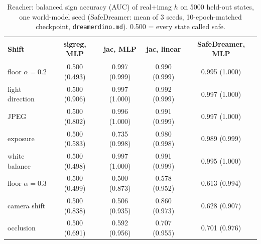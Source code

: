 \documentclass{article}
\begin{document}
\begin{table}[t]\centering\small
\caption{Reacher: balanced sign accuracy (AUC) of real+imag $h$ on 5000 held-out states, one world-model seed (SafeDreamer: mean of 3 seeds, 10-epoch-matched checkpoint, \texttt{dreamerdino.md}). 0.500 = every state called safe.}
\label{tab:reacher_signacc}
\begin{tabular}{lcccc}
\toprule
Shift & sigreg, MLP & jac, MLP & jac, linear & SafeDreamer, MLP \\
\midrule
floor $\alpha=0.2$ & 0.500 (0.493) & 0.997 (0.999) & 0.990 (0.999) & 0.995 (1.000) \\
light direction & 0.500 (0.906) & 0.997 (1.000) & 0.992 (0.999) & 0.997 (1.000) \\
JPEG & 0.500 (0.802) & 0.996 (1.000) & 0.991 (0.999) & 0.997 (1.000) \\
exposure & 0.500 (0.583) & 0.735 (0.998) & 0.980 (0.998) & 0.989 (0.999) \\
white balance & 0.500 (0.498) & 0.997 (1.000) & 0.991 (0.999) & 0.995 (1.000) \\
floor $\alpha=0.3$ & 0.500 (0.499) & 0.500 (0.873) & 0.578 (0.952) & 0.613 (0.994) \\
camera shift & 0.500 (0.838) & 0.506 (0.935) & 0.860 (0.973) & 0.628 (0.907) \\
occlusion & 0.500 (0.691) & 0.592 (0.956) & 0.707 (0.955) & 0.701 (0.976) \\
\bottomrule
\end{tabular}
\end{table}
\end{document}
